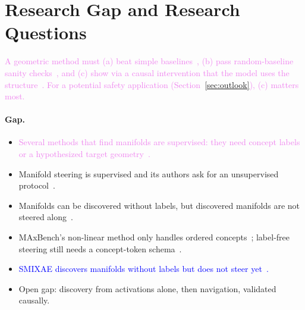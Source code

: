 \documentclass[11pt,a4paper]{article}
\newcommand{\fromextra}[1]{\textcolor{blue}{#1}}
\newcommand{\fromnotes}[1]{\textcolor{green!50!black}{#1}}
\newcommand{\fromold}[1]{\textcolor{violet}{#1}}
\newcommand{\fromclaude}[1]{\textcolor{orange!85!black}{#1}}
\newcommand{\fromextra}[1]{#1}
\newcommand{\fromnotes}[1]{#1}
\newcommand{\fromold}[1]{#1}
\newcommand{\fromclaude}[1]{#1}
\begin{document}
\section{Research Gap and Research Questions}\label{sec:thesis}
\fromold{A geometric method must (a) beat simple baselines~\cite{wu2025axbench}, (b) pass random-baseline sanity checks~\cite{korznikov2026sanity}, and (c) show via a causal intervention that the model uses the structure~\cite{wurgaft2026manifoldsteering}. For a potential safety application (\fromclaude{Section~\ref{sec:outlook}}), (c) matters most.}

\paragraph{Gap.}
\begin{itemize}
  \item \fromold{Several methods that find manifolds are supervised: they need concept labels or a hypothesized target geometry~\cite{modell2026probing,tiblias2026smds}.}
  \item \fromnotes{Manifold steering is supervised and its authors ask for an unsupervised protocol~\cite{wurgaft2026manifoldsteering}.}
  \item \fromnotes{Manifolds can be discovered without labels, but discovered manifolds are not steered along~\cite{bhalla2026saemanifolds}.}
  \item \fromnotes{MAxBench's non-linear method only handles ordered concepts~\cite{appapogu2026maxbench}; label-free steering still needs a concept-token schema~\cite{oozeer2026riemannian}.}
  \item \fromextra{SMIXAE discovers manifolds without labels but does not steer yet~\cite{francel2026smixae}.}
  \item \fromnotes{Open gap: discovery from activations alone, then navigation, validated causally.}
\end{itemize}
\end{document}
